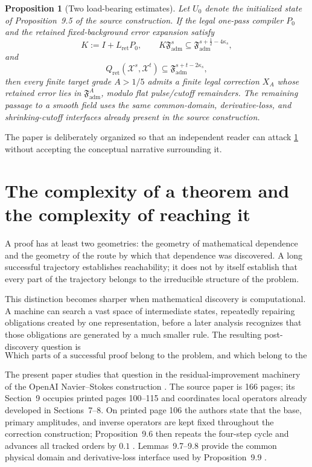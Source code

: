 \documentclass[11pt]{article}
\numberwithin{equation}{section}
\theoremstyle{highend}
\newtheorem{proposition}[theorem]{Proposition}
\theoremstyle{definition}
\newcommand{\Fadm}{\mathfrak F_{\mathrm{adm}}}
\newcommand{\X}{\mathcal X}
\newcommand{\Qret}{Q_{\mathrm{ret}}}
\begin{document}
\begin{proposition}[Two load-bearing estimates]\label{prop:two-estimates}
Let $U_0$ denote the initialized state of Proposition~9.5 of the source construction. If the legal one-pass compiler $P_0$ and the retained fixed-background error expansion satisfy
\[
K:=I+L_{\mathrm{ret}}P_0,
\qquad
K\Fadm^s\subseteq \Fadm^{s+\frac12-4\kappa_s},
\]
and
\[
\Qret(\X^s,\X^t)\subseteq \Fadm^{s+t-2\kappa_s},
\]
then every finite target grade $A>1/5$ admits a finite legal correction $X_A$ whose retained error lies in $\Fadm^A$, modulo flat pulse/cutoff remainders. The remaining passage to a smooth field uses the same common-domain, derivative-loss, and shrinking-cutoff interfaces already present in the source construction.
\end{proposition}

\noindent The paper is deliberately organized so that an independent reader can attack \cref{prop:two-estimates} without accepting the conceptual narrative surrounding it.

\tableofcontents
\clearpage

\section{The complexity of a theorem and the complexity of reaching it}
A proof has at least two geometries: the geometry of mathematical dependence and the geometry of the route by which that dependence was discovered. A long successful trajectory establishes reachability; it does not by itself establish that every part of the trajectory belongs to the irreducible structure of the problem.

This distinction becomes sharper when mathematical discovery is computational. A machine can search a vast space of intermediate states, repeatedly repairing obligations created by one representation, before a later analysis recognizes that those obligations are generated by a much smaller rule. The resulting post-discovery question is
\[
\boxed{\text{Which parts of a successful proof belong to the problem, and which belong to the representation?}}
\]

The present paper studies that question in the residual-improvement machinery of the OpenAI Navier--Stokes construction \cite{OpenAI2026NS}. The source paper is 166 pages; its Section~9 occupies printed pages 100--115 and coordinates local operators already developed in Sections~7--8. On printed page 106 the authors state that the base, primary amplitudes, and inverse operators are kept fixed throughout the correction construction; Proposition~9.6 then repeats the four-step cycle and advances all tracked orders by $0.1$ \cite[pp.~106--111]{OpenAI2026NS}. Lemmas~9.7--9.8 provide the common physical domain and derivative-loss interface used by Proposition~9.9 \cite[pp.~111--115]{OpenAI2026NS}.
\end{document}
